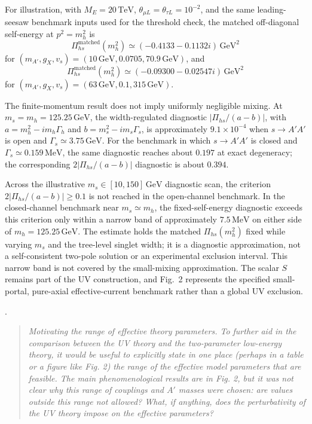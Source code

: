 \documentclass[12pt,a4paper]{article}
\begin{document}
For illustration, with \(M_E=20\,\mathrm{TeV}\), \(\theta_{\mu L}=\theta_{\tau L}=10^{-2}\), and the same leading-seesaw benchmark inputs used for the threshold check, the matched off-diagonal self-energy at \(p^2=m_h^2\) is
\[
\Pi_{hs}^{\mathrm{matched}}(m_h^2)
\simeq(-0.4133-0.1132i)\,\mathrm{GeV}^2
\]
for \((m_{A'},g_X,v_s)=(10\,\mathrm{GeV},0.0705,70.9\,\mathrm{GeV})\), and
\[
\Pi_{hs}^{\mathrm{matched}}(m_h^2)
\simeq(-0.09300-0.02547i)\,\mathrm{GeV}^2
\]
for \((m_{A'},g_X,v_s)=(63\,\mathrm{GeV},0.1,315\,\mathrm{GeV})\). 

The finite-momentum result does not imply uniformly negligible mixing. At \(m_s=m_h=125.25\,\mathrm{GeV}\), the width-regulated diagnostic \(|\Pi_{hs}/(a-b)|\), with \(a=m_h^2-i m_h\Gamma_h\) and \(b=m_s^2-i m_s\Gamma_s\), is approximately \(9.1\times10^{-4}\) when \(s\to A'A'\) is open and \(\Gamma_s\simeq3.75\,\mathrm{GeV}\). For the benchmark in which \(s\to A'A'\) is closed and \(\Gamma_s\simeq0.159\,\mathrm{MeV}\), the same diagnostic reaches about \(0.197\) at exact degeneracy; the corresponding \(2|\Pi_{hs}/(a-b)|\) diagnostic is about \(0.394\). 

Across the illustrative \(m_s\in[10,150]\,\mathrm{GeV}\) diagnostic scan, the criterion \(2|\Pi_{hs}/(a-b)|\geq0.1\) is not reached in the open-channel benchmark. In the closed-channel benchmark near \(m_s\simeq m_h\), the fixed-self-energy diagnostic exceeds this criterion only within a narrow band of approximately \(7.5\,\mathrm{MeV}\) on either side of \(m_h=125.25\,\mathrm{GeV}\). The estimate holds the matched \(\Pi_{hs}(m_h^2)\) fixed while varying \(m_s\) and the tree-level singlet width; it is a diagnostic approximation, not a self-consistent two-pole solution or an experimental exclusion interval. This narrow band is not covered by the small-mixing approximation. The scalar \(S\) remains part of the UV construction, and Fig.~2 represents the specified small-portal, pure-axial effective-current benchmark rather than a global UV exclusion.



\medskip
{}. \begin{quote}\itshape
Motivating the range of effective theory parameters. To further aid in the comparison between the UV theory and the two-parameter low-energy theory, it would be useful to explicitly state in one place (perhaps in a table or a figure like Fig. 2) the range of the effective model parameters that are feasible. The main phenomenological results are in Fig. 2, but it was not clear why this range of couplings and \(A'\) masses were chosen: are values outside this range not allowed? What, if anything, does the perturbativity of the UV theory impose on the effective parameters?\end{quote}
\end{document}
